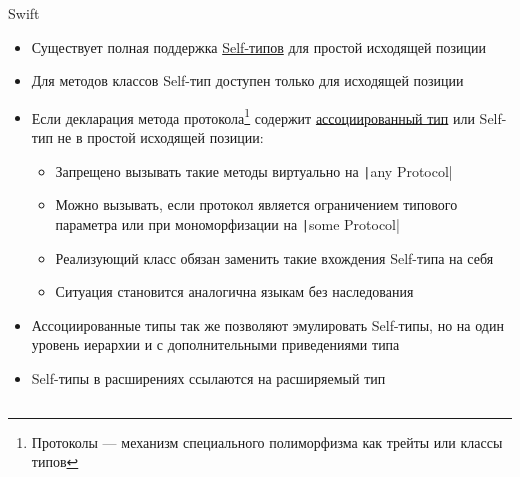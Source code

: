 \documentclass[handout,aspectratio=169,usenames,dvipsnames]{beamer}
\begin{document}
    \begin{frame}{Swift}
        \begin{itemize}
            \item Существует полная поддержка \href{https://docs.swift.org/swift-book/documentation/the-swift-programming-language/types/\#Self-Type}{\color{blue}Self-типов} для простой исходящей позиции \pause
            \item Для методов классов Self-тип доступен только для исходящей позиции \pause
            \item Если декларация метода протокола\footnote{Протоколы --- механизм специального полиморфизма как трейты или классы типов} содержит \href{https://docs.swift.org/swift-book/documentation/the-swift-programming-language/generics/\#Associated-Types}{\color{blue}ассоциированный тип} или Self-тип не в простой исходящей позиции: \pause
            \begin{itemize}
                \item Запрещено вызывать такие методы виртуально на \texttt|any Protocol|
                \item Можно вызывать, если протокол является ограничением типового параметра или при мономорфизации на \texttt|some Protocol|
                \item Реализующий класс обязан заменить такие вхождения Self-типа на себя
                \item Ситуация становится аналогична языкам без наследования
            \end{itemize} \pause
            \item Ассоциированные типы так же позволяют эмулировать Self-типы, но на один уровень иерархии и с дополнительными приведениями типа \pause
            \item Self-типы в расширениях ссылаются на расширяемый тип
        \end{itemize}
    \end{frame}

    \subsection{}
\end{document}
